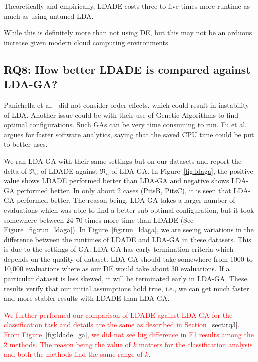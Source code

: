 \documentclass[twocolumn,5p,sort&compress]{elsarticle}
\theoremstyle{break}
\begin{document}
  
  \begin{lesson}
    Theoretically and empirically, LDADE costs three to five times more runtime
    as much as using untuned LDA.
  \end{lesson}

  While this is definitely more than not using DE, but this may not be an arduous increase
  given modern cloud computing environments.

\subsection{\textbf{RQ8: How better LDADE is compared against LDA-GA?}}
\label{sect:rq8}

Panichella et al.~\cite{panichella2013effectively} did not consider order effects, which could result in instability of LDA. 
Another issue could be with their use of Genetic Algorithms to find optimal configurations. Such GAs can be very time consuming to run.
 Fu et al.~\cite{fu2017easy} argues for faster software analytics,
 saying that the saved CPU time
 could be put to better uses.

We ran LDA-GA with their same settings but on our datasets and report the delta of $\Re_n$ of LDADE against $\Re_n$ of LDA-GA. In Figure~\ref{fig:ldaga}, the positive value shows LDADE performed better than LDA-GA and negative shows LDA-GA performed better. In only about 2 cases (PitsB, PitsC), it is seen that LDA-GA performed better. The reason being, LDA-GA takes a larger number of evaluations which was able to find a better sub-optimal configuration, but it took somewhere between 24-70 times more time than LDADE (See Figure~\ref{fig:run_ldaga}). In Figure~\ref{fig:run_ldaga}, we are seeing variations in the difference between the runtimes of LDADE and LDA-GA in these datasets. This is due to the settings of GA. LDA-GA has early termination criteria which depends on the quality of dataset. LDA-GA should take somewhere from 1000 to 10,000 evaluations where as our DE would take about 30 evaluations. If a particular dataset is less skewed, it will be terminated early in LDA-GA. These results verify that our initial assumptions hold true, i.e., we can get much faster and more stabler results with LDADE than LDA-GA.


\textcolor{red}{We further performed our comparison of LDADE against LDA-GA for the classification task and details are the same as described in Section~\ref{sect:rq3}.
 From Figure~\ref{fig:ldade_ga}, we did not see big difference in F1 results among the 2 methods. The reason being the value of $k$ matters for the classification analysis and both the methods find the same range of $k$.}
\end{document}
